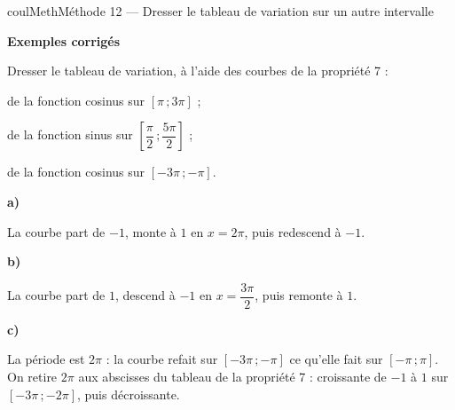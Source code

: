 \documentclass[11pt,a4paper]{article}
\makeatletter
\newcommand{\lycee@intff}[2]{\left[#1\,;#2\right]}
\providecommand{\intff}{\lycee@intff}%
\newcounter{lycee@signet}
\newcommand{\signet}[3][]{\stepcounter{lycee@signet}%
  \edef\lycee@dest{\if\relax\detokenize{#1}\relax
    signet.\arabic{lycee@signet}\else#1\fi}%
  \hypertarget{\lycee@dest}{}\bookmark[level=#2,dest=\lycee@dest]{#3}}
\newcommand{\res}[1]{#1}
\newcounter{methode}
\newenvironment{methodebox}[1][Méthode]{\stepcounter{methode}%
  \begin{boitecours}[phantom={\signet[methode-\arabic{methode}]{2}{#1}}]{coulMeth}{#1}}%
  {\end{boitecours}}
\newcommand{\etape}[1]{\par\smallskip\textbf{\color{coulMeth}#1}\par\nobreak\smallskip}
\newcommand{\cas}[1]{\par\smallskip\noindent\textbf{\color{coulExo}#1}\vadjust{\nobreak}}
\newenvironment{correction}{\par}{\par}
\newcommand{\etapeexemples}{\etape{Exemples corrigés}}
\makeatother
\begin{document}
\begin{methodebox}[Méthode 12 --- Dresser le tableau de variation sur un autre intervalle]
\etapeexemples
Dresser le tableau de variation, à l'aide des courbes de la propriété 7 :
\begin{questions}[label=\alph*)]
  \item de la fonction cosinus sur $\intff{\pi}{3\pi}$ ;
  \item de la fonction sinus sur $\intff{\dfrac{\pi}{2}}{\dfrac{5\pi}{2}}$ ;
  \item de la fonction cosinus sur $\intff{-3\pi}{-\pi}$.
\end{questions}
\begin{correction}
\cas{a)}\par\nopagebreak
\begin{minipage}[c]{0.46\linewidth}\raggedright
La courbe part de $-1$, \res{monte à $1$ en $x=2\pi$, puis redescend à $-1$}.
\end{minipage}\hfill
\begin{minipage}[c]{0.50\linewidth}\centering
{}
\end{minipage}
\cas{b)}\par\nopagebreak
\begin{minipage}[c]{0.46\linewidth}\raggedright
La courbe part de $1$, \res{descend à $-1$ en $x=\dfrac{3\pi}{2}$, puis remonte à $1$}.
\end{minipage}\hfill
\begin{minipage}[c]{0.50\linewidth}\centering
{}
\end{minipage}
\cas{c)}\par\nopagebreak
\begin{minipage}[c]{0.46\linewidth}\raggedright
La période est $2\pi$ : la courbe refait sur $\intff{-3\pi}{-\pi}$ ce qu'elle fait sur
$\intff{-\pi}{\pi}$. On retire $2\pi$ aux abscisses du tableau de la propriété 7 :
\res{croissante de $-1$ à $1$ sur $\intff{-3\pi}{-2\pi}$, puis décroissante}.
\end{minipage}\hfill
\begin{minipage}[c]{0.50\linewidth}\centering
{}
\end{minipage}
\end{correction}


\end{methodebox}
\end{document}
